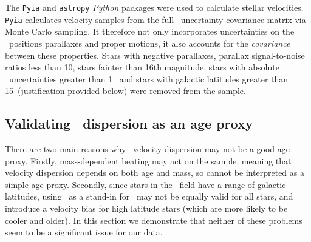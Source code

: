 The {\tt Pyia} \citep{price-whelan_2018} and {\tt astropy} \citep{astropy2013,
astropy2018} {\it Python} packages were used to calculate stellar velocities.
{\tt Pyia} calculates velocity samples from the full \gaia\ uncertainty
covariance matrix via Monte Carlo sampling.
It therefore not only incorporates uncertainties on the \gaia\ positions
parallaxes and proper motions, it also accounts for the {\it covariance}
between these properties.
Stars with negative parallaxes, parallax signal-to-noise ratios less than 10,
stars fainter than 16th magnitude, stars with absolute \vb\ uncertainties
greater than 1 \kms\, and stars with galactic latitudes greater than
15\degrees\ (justification provided below) were removed from the sample.

\subsection{Validating \vb\ dispersion as an age proxy}
\label{sec:mass-dependent-heating}

There are two main reasons why \vb\ velocity dispersion may not be a good age
proxy.
Firstly, mass-dependent heating may act on the sample, meaning that velocity
dispersion depends on both age and mass, so cannot be interpreted as a simple
age proxy.
Secondly, since stars in the \kepler\ field have a range of galactic
latitudes, using \vb\ as a stand-in for \vz\ may not be equally valid for all
stars, and introduce a velocity bias for high latitude stars (which are more
likely to be cooler and older).
In this section we demonstrate that neither of these problems seem to be a
significant issue for our data.

